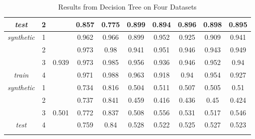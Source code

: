 \documentclass[11pt]{article}
\begin{document}
\begin{center}
\begin{longtable}{| c | c | c | c | c | c | c | c | c | c |}
    		 \textit{test}    & 2 & & 0.857 & 0.775 & 0.899& 0.894& 0.896& 0.898& 0.895\\
    		 \hline
    		 \textit{synthetic} & 1 & & 0.962 & 0.966 & 0.899& 0.952& 0.925& 0.909& 0.941\\
    		                    & 2 & & 0.973 & 0.98 & 0.941& 0.951& 0.946& 0.943& 0.949\\
    		                    & 3 & 0.939 & 0.973 & 0.985 & 0.956& 0.936& 0.946& 0.952& 0.94\\
    		 \textit{train}	    & 4 & & 0.971 & 0.988 & 0.963& 0.918& 0.94& 0.954& 0.927\\
    		 \hline
    		 \textit{synthetic} & 1 & & 0.734 & 0.816 & 0.504& 0.511& 0.507& 0.505& 0.51\\
    		                    & 2 & & 0.737 & 0.841 & 0.459& 0.416& 0.436& 0.45& 0.424\\
    		                    & 3 & 0.501&0.772 & 0.837 & 0.508& 0.556& 0.531& 0.517& 0.546\\
    		 \textit{test}	    & 4 & &0.759 & 0.84 & 0.528& 0.522& 0.525& 0.527& 0.523\\
    		 \hline
    	\caption{Results from Decision Tree on Four Datasets}
    \end{longtable}
    \end{center}
    
\end{document}
